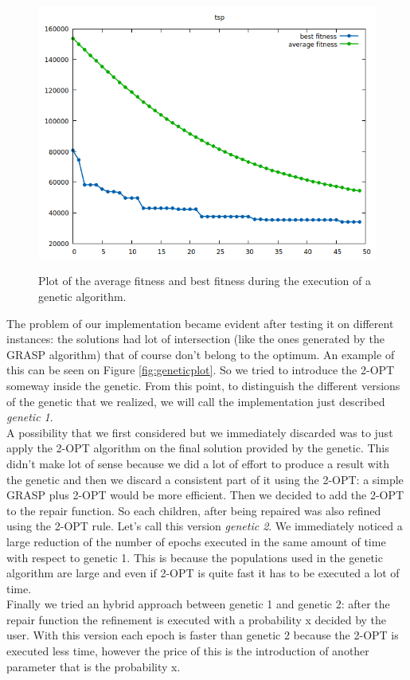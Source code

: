 \begin{figure}[h!]
\centering
	\includegraphics[scale=0.6]{media/fitnessPlot.png} \\
	\caption{Plot of the average fitness and best fitness during the execution of a genetic algorithm.}
	\label{fig:fitness}
\end{figure}

\noindent The problem of our implementation became evident after testing it on different instances: the solutions had lot of intersection (like the ones generated by the GRASP algorithm) that of course don't belong to the optimum. An example of this can be seen on Figure \ref{fig:geneticplot}. So we tried to introduce the 2-OPT someway inside the genetic. From this point, to distinguish the different versions of the genetic that we realized, we will call the implementation just described \textit{genetic 1}. \\
A possibility that we first considered but we immediately discarded was to just apply the 2-OPT algorithm on the final solution provided by the genetic. This didn't make lot of sense because we did a lot of effort to produce a result with the genetic and then we discard a consistent part of it using the 2-OPT: a simple GRASP plus 2-OPT would be more efficient.
Then we decided to add the 2-OPT to the repair function. So each children, after being repaired was also refined using the 2-OPT rule. Let's call this version \textit{genetic 2}. We immediately noticed a large reduction of the number of epochs executed in the same amount of time with respect to genetic 1. This is because the populations used in the genetic algorithm are large and even if 2-OPT is quite fast it has to be executed a lot of time. \\
Finally we tried an hybrid approach between genetic 1 and genetic 2: after the repair function the refinement is executed with a probability x decided by the user. With this version each epoch is faster than genetic 2 because the 2-OPT is executed less time, however the price of this is the introduction of another parameter that is the probability x.\\

